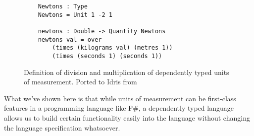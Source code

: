 \begin{figure}[h]
  \caption{Definition of division and multiplication of dependently typed units
  of measurement. Ported to Idris from \protect\cite{gundry2013}}
  \label{division}
  \begin{lstlisting}
    Newtons : Type
    Newtons = Unit 1 -2 1

    newtons : Double -> Quantity Newtons
    newtons val = over 
        (times (kilograms val) (metres 1)) 
        (times (seconds 1) (seconds 1))
  \end{lstlisting}
\end{figure}

What we've shown here is that while units of measurement can be first-class
features in a programming language like F\#, a dependently typed language allows
us to build certain functionality easily into the language without changing the
language specification whatsoever. 